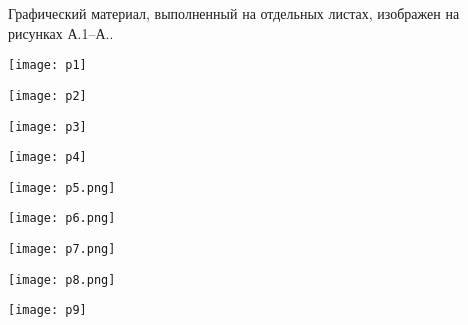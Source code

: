 
Графический материал, выполненный на отдельных листах,
изображен на рисунках А.1--А..
\setcounter{числоПлакатов}{0}

\renewcommand{\thefigure}{А.\arabic{figure}} %

\begin{landscape}

\begin{плакат}
    \texttt{[image: p1]}
    \label{pl1:image}
\end{плакат}

\begin{плакат}
    \texttt{[image: p2]}
    \label{pl2:image}
\end{плакат}

\begin{плакат}
    \texttt{[image: p3]}
    \label{pl3:image}
\end{плакат}

\begin{плакат}
    \texttt{[image: p4]}
    \label{pl4:image}
\end{плакат}

\begin{плакат}
    \texttt{[image: p5.png]}
    \label{pl5:image}
\end{плакат}

\begin{плакат}
    \texttt{[image: p6.png]}
    \label{pl6:image}
\end{плакат}

\begin{плакат}
    \texttt{[image: p7.png]}
    \label{pl7:image}
\end{плакат}

\begin{плакат}
    \texttt{[image: p8.png]}
    \label{pl8:image}
\end{плакат}

\begin{плакат}
    \texttt{[image: p9]}
    \label{pl9:image}
\end{плакат}

\end{landscape}
